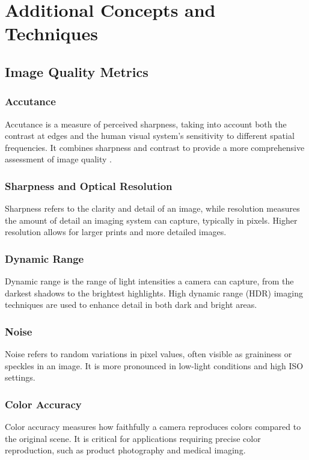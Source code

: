\section{Additional Concepts and Techniques}

\subsection{Image Quality Metrics}

\subsubsection{Accutance}
Accutance is a measure of perceived sharpness, taking into account both the contrast at edges and the human visual system's sensitivity to different spatial frequencies. It combines sharpness and contrast to provide a more comprehensive assessment of image quality \cite{accutance} .

\subsubsection{Sharpness and Optical Resolution}
Sharpness refers to the clarity and detail of an image, while resolution measures the amount of detail an imaging system can capture, typically in pixels. Higher resolution allows for larger prints and more detailed images.

\subsubsection{Dynamic Range}
Dynamic range is the range of light intensities a camera can capture, from the darkest shadows to the brightest highlights. High dynamic range (HDR) imaging techniques are used to enhance detail in both dark and bright areas.

\subsubsection{Noise}
Noise refers to random variations in pixel values, often visible as graininess or speckles in an image. It is more pronounced in low-light conditions and high ISO settings.

\subsubsection{Color Accuracy}
Color accuracy measures how faithfully a camera reproduces colors compared to the original scene. It is critical for applications requiring precise color reproduction, such as product photography and medical imaging.

